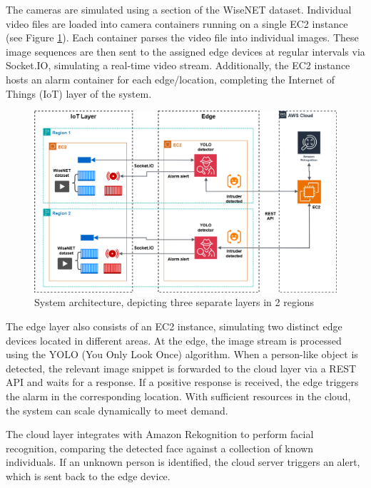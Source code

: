 \documentclass[conference]{IEEEtran}
\begin{document}
The cameras are simulated using a section of the WiseNET dataset. Individual video files are loaded into camera containers running on a single EC2 instance (see Figure \ref{fig:architecture}). Each container parses the video file into individual images. These image sequences are then sent to the assigned edge devices at regular intervals via Socket.IO, simulating a real-time video stream. Additionally, the EC2 instance hosts an alarm container for each edge/location, completing the Internet of Things (IoT) layer of the system.

\begin{figure}[h!]
    \centering
    \includegraphics[width=1\linewidth]{DS_architecture_final.png}
    \caption{System architecture, depicting three separate layers in 2 regions}
    \label{fig:architecture}
\end{figure}

The edge layer also consists of an EC2 instance, simulating two distinct edge devices located in different areas. At the edge, the image stream is processed using the YOLO (You Only Look Once) algorithm. When a person-like object is detected, the relevant image snippet is forwarded to the cloud layer via a REST API and waits for a response. If a positive response is received, the edge triggers the alarm in the corresponding location. With sufficient resources in the cloud, the system can scale dynamically to meet demand.

The cloud layer integrates with Amazon Rekognition to perform facial recognition, comparing the detected face against a collection of known individuals. If an unknown person is identified, the cloud server triggers an alert, which is sent back to the edge device.
\end{document}
